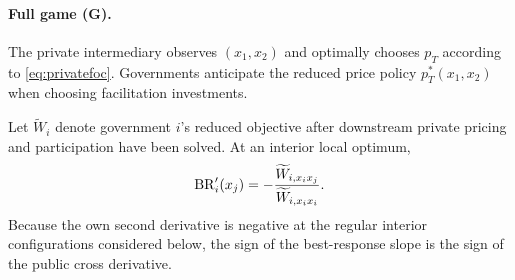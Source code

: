 \paragraph{Full game (G).}
The private intermediary observes $(x_1,x_2)$ and optimally chooses $p_T$ according to \eqref{eq:privatefoc}. Governments anticipate the reduced price policy $p_T^*(x_1,x_2)$ when choosing facilitation investments.

Let $\widetilde W_i$ denote government $i$'s reduced objective after downstream private pricing and participation have been solved. At an interior local optimum,
\begin{equation}
\mathrm{BR}_i'(x_j)
=
-\frac{\widetilde W_{i,x_ix_j}}
{\widetilde W_{i,x_ix_i}}.
\label{eq:brslope}
\end{equation}
Because the own second derivative is negative at the regular interior configurations considered below, the sign of the best-response slope is the sign of the public cross derivative.
